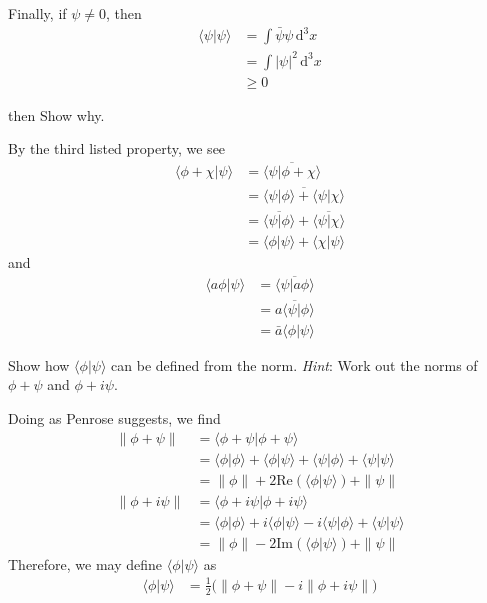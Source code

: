 \documentclass[../road-to-reality.tex]{subfiles}
\begin{document}
\begin{questions}
\begin{solution}
	Finally, if $\psi\neq0$, then
	\begin{align*}
		\langle\psi|\psi\rangle &= \int\bar{\psi}\psi\,\mathrm{d}^3x \\
		&= \int |\psi|^2\,\mathrm{d}^3x \\
		&\geq 0
	\end{align*}
\end{solution}
then
\question Show why.

\begin{solution}
	By the third listed property, we see
	\begin{align*}
		\langle\phi+\chi|\psi\rangle &= \overline{\langle\psi|\phi+\chi\rangle} \\
		&= \overline{\langle\psi|\phi\rangle + \langle\psi|\chi\rangle} \\
		&= \overline{\langle\psi|\phi\rangle} + \overline{\langle\psi|\chi\rangle} \\
		&= \langle\phi|\psi\rangle + \langle\chi|\psi\rangle
	\end{align*}
	and
	\begin{align*}
		\langle{a}\phi|\psi\rangle &= \overline{\langle\psi|a\phi\rangle} \\
		&= \overline{a\langle\psi|\phi\rangle} \\
		&= \bar{a}\langle\phi|\psi\rangle
	\end{align*}
\end{solution}

\question Show how $\langle\phi|\psi\rangle$ can be defined from the norm. \textit{Hint}:
Work out the norms of $\phi + \psi$ and $\phi + i\psi$.

\begin{solution}
	Doing as Penrose suggests, we find
	\begin{align*}
		\|\phi+\psi\| &= \langle\phi + \psi|\phi + \psi\rangle \\
		&= \langle\phi|\phi\rangle + \langle\phi|\psi\rangle + \langle\psi|\phi\rangle + \langle\psi|\psi\rangle \\
		&= \|\phi\| + 2\mathrm{Re}(\langle{\phi|\psi}\rangle) + \|\psi\| \\
		\|\phi + i\psi\| &= \langle\phi+ i\psi|\phi + i\psi\rangle \\
		&= \langle\phi|\phi\rangle + i\langle\phi|\psi\rangle - i\langle\psi|\phi\rangle + \langle\psi|\psi\rangle \\
		&= \|\phi\| - 2\mathrm{Im}(\langle\phi|\psi\rangle) + \|\psi\|
	\end{align*}
	Therefore, we may define $\langle\phi|\psi\rangle$ as
	\begin{align*}
		\langle\phi|\psi\rangle &= \frac{1}{2}\Big(\|\phi+\psi\| - i\|\phi + i\psi\|\Big)
	\end{align*}
\end{solution}


\end{questions}
\end{document}
